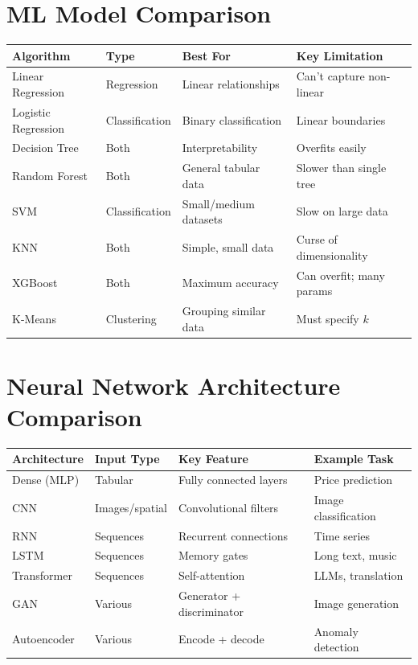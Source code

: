 \documentclass[12pt, a4paper, oneside]{book}
\begin{document}
\section{ML Model Comparison}

\begin{center}
\begin{tabular}{l l l l}
\toprule
\textbf{Algorithm} & \textbf{Type} & \textbf{Best For} & \textbf{Key Limitation} \\
\midrule
Linear Regression & Regression & Linear relationships & Can't capture non-linear \\
Logistic Regression & Classification & Binary classification & Linear boundaries \\
Decision Tree & Both & Interpretability & Overfits easily \\
Random Forest & Both & General tabular data & Slower than single tree \\
SVM & Classification & Small/medium datasets & Slow on large data \\
KNN & Both & Simple, small data & Curse of dimensionality \\
XGBoost & Both & Maximum accuracy & Can overfit; many params \\
K-Means & Clustering & Grouping similar data & Must specify $k$ \\
\bottomrule
\end{tabular}
\end{center}

\section{Neural Network Architecture Comparison}

\begin{center}
\begin{tabular}{l l l l}
\toprule
\textbf{Architecture} & \textbf{Input Type} & \textbf{Key Feature} & \textbf{Example Task} \\
\midrule
Dense (MLP) & Tabular & Fully connected layers & Price prediction \\
CNN & Images/spatial & Convolutional filters & Image classification \\
RNN & Sequences & Recurrent connections & Time series \\
LSTM & Sequences & Memory gates & Long text, music \\
Transformer & Sequences & Self-attention & LLMs, translation \\
GAN & Various & Generator + discriminator & Image generation \\
Autoencoder & Various & Encode + decode & Anomaly detection \\
\bottomrule
\end{tabular}
\end{center}
\end{document}
